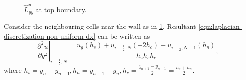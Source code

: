 \documentclass{article}
\numberwithin{equation}{section}
\begin{document}
\begin{figure}[H]
  \caption{$\hat{L}^u_{yy}$ at top boundary.}\label{fig:luxx-top}
\end{figure}

Consider the neighbouring cells near the wall as in \cref{fig:luxx-top}. Resultant \cref{eqn:laplacian-discretization-non-uniform-dx}  can be written as
\begin{equation}\label{eqn:laplacian-discretization-non-uniform-dy}
\left.\frac{\partial^2 u}{\partial y^2}\right|_{i-\frac{1}{2},N}=\frac{u_g\left(h_s\right)+u_{i-\frac{1}{2},N}\left(-2 h_c\right)+u_{i-\frac{1}{2},N-1}\left(h_n\right)}{h_n h_s h_c},
\end{equation}
where $h_s=y_{n}-y_{n-1}, h_n = y_{n+1}-y_n, h_c = \frac{y_{n+1}-y_{n-1}}{2}=\frac{h_s+h_n}{2}$.
\end{document}
